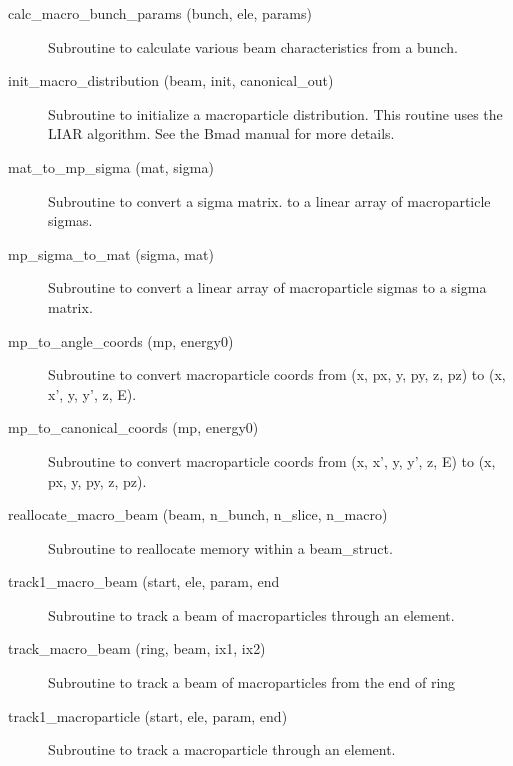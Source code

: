 \begin{description}

\item[calc\_macro\_bunch\_params (bunch, ele, params)] \Newline
Subroutine to calculate various beam characteristics from a bunch.

\item[init\_macro\_distribution (beam, init, canonical\_out)] \Newline 
Subroutine to initialize a macroparticle distribution.
This routine uses the LIAR algorithm. See the Bmad manual for more details.

\item[mat\_to\_mp\_sigma (mat, sigma)] \Newline 
Subroutine to convert a sigma matrix. to a linear array of 
macroparticle sigmas.

\item[mp\_sigma\_to\_mat (sigma, mat)] \Newline 
Subroutine to convert a linear array of macroparticle sigmas to a 
sigma matrix. 

\item[mp\_to\_angle\_coords (mp, energy0)] \Newline 
Subroutine to convert macroparticle coords from 
(x, px, y, py, z, pz) to (x, x', y, y', z, E).

\item[mp\_to\_canonical\_coords (mp, energy0)] \Newline 
Subroutine to convert macroparticle coords from 
(x, x', y, y', z, E) to (x, px, y, py, z, pz).

\item[reallocate\_macro\_beam (beam, n\_bunch, n\_slice, n\_macro)] \Newline 
Subroutine to reallocate memory within a beam\_struct.

\item[track1\_macro\_beam (start, ele, param, end] \Newline
Subroutine to track a beam of macroparticles through an element.

\item[track\_macro\_beam (ring, beam, ix1, ix2)] \Newline 
Subroutine to track a beam of macroparticles from the end of
ring%

\item[track1\_macroparticle (start, ele, param, end)] \Newline 
Subroutine to track a macroparticle through an element.

\end{description}

